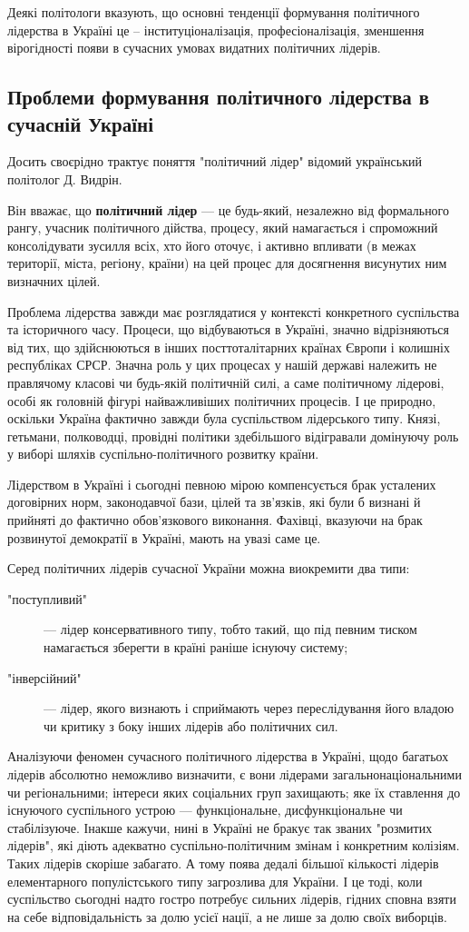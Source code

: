 Деякі політологи вказують, що основні тенденції формування політичного лідерства в Україні це – інституціоналізація, професіоналізація, зменшення вірогідності появи в сучасних умовах видатних політичних лідерів.
\subsection{Проблеми формування політичного лідерства в сучасній Україні}
Досить своєрідно трактує поняття "політичний лідер" відомий український політолог Д. Видрін.

Він вважає, що \textbf{політичний лідер} — це будь-який, незалежно від формального рангу, учасник політичного дійства, процесу, який намагається і спроможний консолідувати зусилля всіх, хто його оточує, і активно впливати (в межах території, міста, регіону, країни) на цей процес для досягнення висунутих ним визначних цілей.

Проблема лідерства завжди має розглядатися у контексті конкретного суспільства та історичного часу. Процеси, що відбуваються в Україні, значно відрізняються від тих, що здійснюються в інших посттоталітарних країнах Європи і колишніх республіках СРСР. Значна роль у цих процесах у нашій державі належить не правлячому класові чи будь-якій політичній силі, а саме політичному лідерові, особі як головній фігурі найважливіших політичних процесів. І це природно, оскільки Україна фактично завжди була суспільством лідерського типу. Князі, гетьмани, полководці, провідні політики здебільшого відігравали домінуючу роль у виборі шляхів суспільно-політичного розвитку країни.

Лідерством в Україні і сьогодні певною мірою компенсується брак усталених договірних норм, законодавчої бази, цілей та зв'язків, які були б визнані й прийняті до фактично обов'язкового виконання. Фахівці, вказуючи на брак розвинутої демократії в Україні, мають на увазі саме це.

Серед політичних лідерів сучасної України можна виокремити два типи:
\begin{description}
\item["поступливий"] — лідер консервативного типу, тобто такий, що під певним тиском намагається зберегти в країні раніше існуючу систему;
\item["інверсійний"] — лідер, якого визнають і сприймають через переслідування його владою чи критику з боку інших лідерів або політичних сил.
\end{description}
Аналізуючи феномен сучасного політичного лідерства в Україні, щодо багатьох лідерів абсолютно неможливо визначити, є вони лідерами загальнонаціональними чи регіональними; інтереси яких соціальних груп захищають; яке їх ставлення до існуючого суспільного устрою — функціональне, дисфункціональне чи стабілізуюче. Інакше кажучи, нині в Україні не бракує так званих "розмитих лідерів", які діють адекватно суспільно-політичним змінам і конкретним колізіям. Таких лідерів скоріше забагато. А тому поява дедалі більшої кількості лідерів елементарного популістського типу загрозлива для України. І це тоді, коли суспільство сьогодні надто гостро потребує сильних лідерів, гідних сповна взяти на себе відповідальність за долю усієї нації, а не лише за долю своїх виборців.

